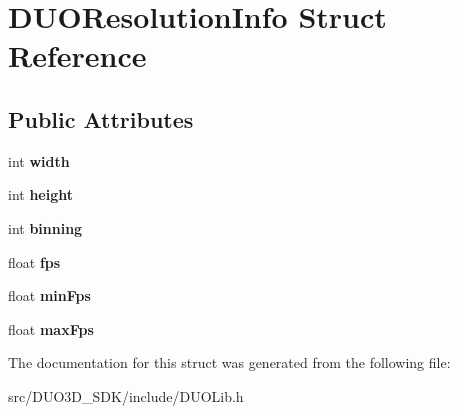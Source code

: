 \hypertarget{struct_d_u_o_resolution_info}{}\section{D\+U\+O\+Resolution\+Info Struct Reference}
\label{struct_d_u_o_resolution_info}
\subsection*{Public Attributes}
\begin{DoxyCompactItemize}
\item 
int {\bfseries width}\hypertarget{struct_d_u_o_resolution_info_ae5f2e3f4c3fc7ec1ab16b84237fc296f}{}\label{struct_d_u_o_resolution_info_ae5f2e3f4c3fc7ec1ab16b84237fc296f}

\item 
int {\bfseries height}\hypertarget{struct_d_u_o_resolution_info_aa5e6238c879221dea7214d918192b08e}{}\label{struct_d_u_o_resolution_info_aa5e6238c879221dea7214d918192b08e}

\item 
int {\bfseries binning}\hypertarget{struct_d_u_o_resolution_info_a6174bec5d0d39913d2975e884e71bb73}{}\label{struct_d_u_o_resolution_info_a6174bec5d0d39913d2975e884e71bb73}

\item 
float {\bfseries fps}\hypertarget{struct_d_u_o_resolution_info_ab3cc107b565aea887c54277a15d640ef}{}\label{struct_d_u_o_resolution_info_ab3cc107b565aea887c54277a15d640ef}

\item 
float {\bfseries min\+Fps}\hypertarget{struct_d_u_o_resolution_info_ad2a70b3082cc82a392c8472d12c14986}{}\label{struct_d_u_o_resolution_info_ad2a70b3082cc82a392c8472d12c14986}

\item 
float {\bfseries max\+Fps}\hypertarget{struct_d_u_o_resolution_info_ae3216da6375cb4658d8261867be8bfae}{}\label{struct_d_u_o_resolution_info_ae3216da6375cb4658d8261867be8bfae}

\end{DoxyCompactItemize}


The documentation for this struct was generated from the following file\+:\begin{DoxyCompactItemize}
\item 
src/\+D\+U\+O3\+D\+\_\+\+S\+D\+K/include/D\+U\+O\+Lib.\+h\end{DoxyCompactItemize}
